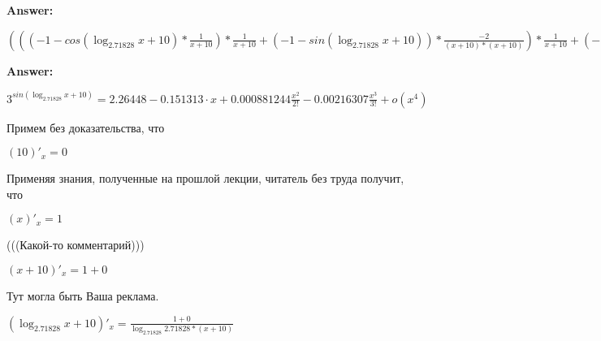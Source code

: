\documentclass[12pt,a4paper,fleqn]{article}
\theoremstyle{definition}
\begin{document}
\textbf{Answer:}

$((( -1  - cos(\log_{ 2.71828 }{ x  +  10 }) * \frac{ 1 }{ x  +  10 }
) * \frac{ 1 }{ x  +  10 }
 + ( -1  - sin(\log_{ 2.71828 }{ x  +  10 })) * \frac{ -2 }{( x  +  10 ) * ( x  +  10 )}
) * \frac{ 1 }{ x  +  10 }
 + ( -1  - sin(\log_{ 2.71828 }{ x  +  10 })) * \frac{ 1 }{ x  +  10 }
 * \frac{ -2 }{( x  +  10 ) * ( x  +  10 )}
 + ( -1  - sin(\log_{ 2.71828 }{ x  +  10 })) * \frac{ 1 }{ x  +  10 }
 * \frac{ -2 }{( x  +  10 ) * ( x  +  10 )}
 + cos(\log_{ 2.71828 }{ x  +  10 }) * \frac{ -1  -  -2  * ( x  +  10  +  x  +  10 )}{( x  +  10 ) * ( x  +  10 ) * ( x  +  10 ) * ( x  +  10 )}
) * { 3 }^{sin(\log_{ 2.71828 }{ x  +  10 })} + (( -1  - sin(\log_{ 2.71828 }{ x  +  10 })) * \frac{ 1 }{ x  +  10 }
 * \frac{ 1 }{ x  +  10 }
 + cos(\log_{ 2.71828 }{ x  +  10 }) * \frac{ -2 }{( x  +  10 ) * ( x  +  10 )}
) * cos(\log_{ 2.71828 }{ x  +  10 }) * \frac{ 1 }{ x  +  10 }
 * { 3 }^{sin(\log_{ 2.71828 }{ x  +  10 })} + (( -1  - sin(\log_{ 2.71828 }{ x  +  10 })) * \frac{ 1 }{ x  +  10 }
 * \frac{ 1 }{ x  +  10 }
 + cos(\log_{ 2.71828 }{ x  +  10 }) * \frac{ -2 }{( x  +  10 ) * ( x  +  10 )}
) * cos(\log_{ 2.71828 }{ x  +  10 }) * \frac{ 1 }{ x  +  10 }
 * { 3 }^{sin(\log_{ 2.71828 }{ x  +  10 })} + cos(\log_{ 2.71828 }{ x  +  10 }) * \frac{ 1 }{ x  +  10 }
 * ((( -1  - sin(\log_{ 2.71828 }{ x  +  10 })) * \frac{ 1 }{ x  +  10 }
 * \frac{ 1 }{ x  +  10 }
 + cos(\log_{ 2.71828 }{ x  +  10 }) * \frac{ -2 }{( x  +  10 ) * ( x  +  10 )}
) * { 3 }^{sin(\log_{ 2.71828 }{ x  +  10 })} + cos(\log_{ 2.71828 }{ x  +  10 }) * \frac{ 1 }{ x  +  10 }
 * cos(\log_{ 2.71828 }{ x  +  10 }) * \frac{ 1 }{ x  +  10 }
 * { 3 }^{sin(\log_{ 2.71828 }{ x  +  10 })})$


\textbf{Answer:}

${ 3 }^{sin(\log_{ 2.71828 }{ x  +  10 })} = 2.26448  -0.151313 \cdot x+ 0.000881244 \frac{x^{2}}{2!}  -0.00216307 \frac{x^{3}}{3!}+ o(x^4)$


Примем без доказательства, что 

$( 10 )'_{x} =  0 $

Применяя знания, полученные на прошлой лекции, читатель без труда получит, что 

$( x )'_{x} =  1 $

(((Какой-то комментарий))) 

$( x  +  10 )'_{x} =  1  +  0 $

Тут могла быть Ваша реклама. 

$(\log_{ 2.71828 }{ x  +  10 })'_{x} = \frac{ 1  +  0 }{\log_{ 2.71828 }{ 2.71828 } * ( x  +  10 )}
$
\end{document}
